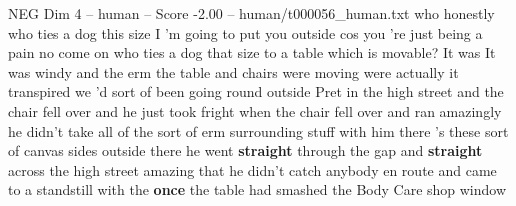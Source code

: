 \begin{textsample}{NEG Dim 4 – human – Score -2.00 – human/t000056\_human.txt}  \label{ex:f4_neg_034}
who honestly who ties a dog this size I 'm going to put you outside cos you 're just being a pain no come on who ties a dog that size to a table which is movable?
It was It was windy and the erm the table and chairs were moving were actually it transpired we 'd sort of been going round outside Pret in the high street and the chair fell over and he just took fright when the chair fell over and ran amazingly he didn't take all of the sort of erm surrounding stuff with him there 's these sort of canvas sides outside there he went \textbf{straight} through the gap and \textbf{straight} across the high street amazing that he didn't catch anybody en route and came to a standstill with the \textbf{once} the table had smashed the Body Care shop window

\end{textsample}
